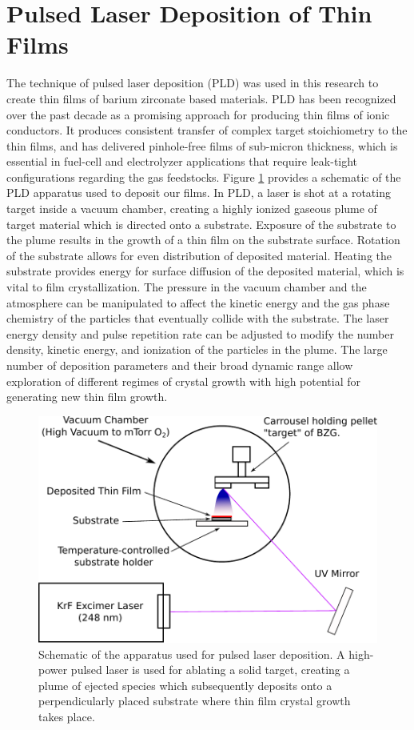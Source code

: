 \vspace{12pt}
\section{Pulsed Laser Deposition of Thin Films} \label{section:PLD}
The technique of pulsed laser deposition (PLD) was used in this research to create thin films of barium zirconate based materials. PLD has been recognized over the past decade as a promising approach for producing thin films of ionic conductors. It produces consistent transfer of complex target stoichiometry to the thin films, and has delivered pinhole-free films of sub-micron thickness, which is essential in fuel-cell and electrolyzer applications that require leak-tight configurations regarding the gas feedstocks. Figure \ref{fig:PLD_Setup} provides a schematic of the PLD apparatus used to deposit our films. In PLD, a laser is shot at a rotating target inside a vacuum chamber, creating a highly ionized gaseous plume of target material which is directed onto a substrate.  Exposure of the substrate to the plume results in the growth of a thin film on the substrate surface. Rotation of the substrate allows for even distribution of deposited material. Heating the substrate provides energy for surface diffusion of the deposited material, which is vital to film crystallization. The pressure in the vacuum chamber and the atmosphere can be manipulated to affect the kinetic energy and the gas phase chemistry of the particles that eventually collide with the substrate. The laser energy density and pulse repetition rate can be adjusted to modify the number density, kinetic energy, and ionization of the particles in the plume. The large number of deposition parameters and their broad dynamic range allow exploration of different regimes of crystal growth with high potential for generating new thin film growth. 

\begin{figure}
    \centering
    \includegraphics{Figures/PLD_2.pdf}
    \caption{Schematic of the apparatus used for pulsed laser deposition. A high-power pulsed laser is used for ablating a solid target, creating a plume of ejected species which subsequently deposits onto a perpendicularly placed substrate where thin film crystal growth takes place.}
    \label{fig:PLD_Setup}
\end{figure}
